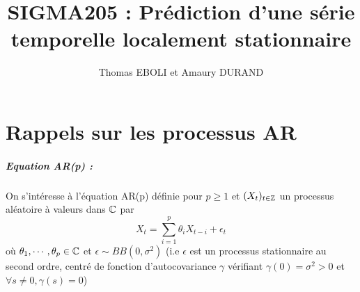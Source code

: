 \documentclass{report}
\title{SIGMA205 : Prédiction d'une série temporelle localement
stationnaire}
\author{Thomas EBOLI et Amaury DURAND}
\begin{document}
\maketitle
\tableofcontents
\pagebreak
\chapter{Rappels sur les processus AR}
\paragraph{Equation AR(p) :} 
On s'intéresse à l'équation AR(p) définie pour $p\geq 1$ et $(X_t)_{t\in \mathbb{Z}}$ un processus aléatoire à valeurs dans $\mathbb{C}$ par 
\begin{equation}\label{eq:AR}
X_t = \sum_{i=1}^p \theta_i X_{t-i} + \epsilon_t
\tag{AR}
\end{equation}
où $\theta_1,\cdots,\theta_p \in \mathbb{C}$ et $\epsilon \sim BB(0,\sigma^2)$ (i.e $\epsilon$ est un processus stationnaire au second ordre, centré de fonction d'autocovariance $\gamma$ vérifiant $\gamma(0)=\sigma^2 > 0$ et $\forall s\neq 0, \gamma(s)=0$)
\end{document}
